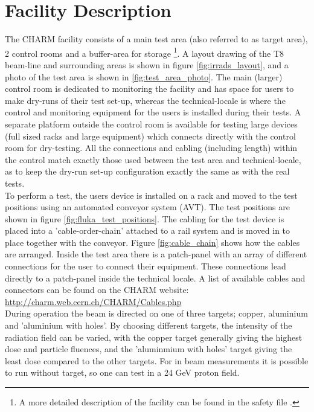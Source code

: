 %

\section{Facility Description}

The CHARM facility consists of a main test area (also referred to as target area), 2 control rooms and a buffer-area for storage \footnote{A more detailed description of the facility can be found in the safety file \cite{charm_safety_file}.}. A layout drawing of the T8 beam-line and surrounding areas is shown in figure \ref{fig:irrads_layout}, and a photo of the test area is shown in \ref{fig:test_area_photo}. The main (larger) control room is dedicated to monitoring the facility and has space for users to make dry-runs of their test set-up, whereas the technical-locale is where the control and monitoring equipment for the users is installed during their tests. A separate platform outside the control room is available for testing large devices (full sized racks and large equipment) which connects directly with the control room for dry-testing. All the connections and cabling (including length) within the control match exactly those used between the test area and technical-locale, as to keep the dry-run set-up configuration exactly the same as with the real tests.  \\

To perform a test, the users device is installed on a rack and moved to the test positions using an automated conveyor system (AVT). The test positions are shown in figure \ref{fig:fluka_test_positions}.  The cabling for the test device is placed into a 'cable-order-chain' attached to a rail system and is moved in to place together with the conveyor. Figure \ref{fig:cable_chain} shows how the cables are arranged. Inside the test area there is a patch-panel with an array of different connections for the user to connect their equipment. These connections lead directly to a patch-panel inside the technical locale. A list of available cables and connectors can be found on the CHARM website: \url{http://charm.web.cern.ch/CHARM/Cables.php} \\

During operation the beam is directed on one of three targets; copper, aluminium and 'aluminium with holes'. By choosing different targets, the intensity of the radiation field can be varied, with the copper target generally giving the highest dose and particle fluences, and the 'aluminmium with holes' target giving the least dose compared to the other targets. For in beam measurements it is possible to run without target, so one can test in a 24 GeV proton field. \\

